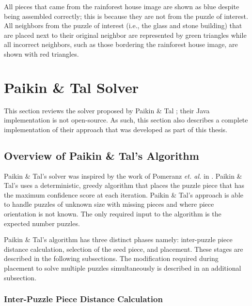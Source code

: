 \documentclass{report}
\begin{document}
All pieces that came from the rainforest house image are shown as blue despite being assembled correctly; this is because they are not from the puzzle of interest.  All neighbors from the puzzle of interest (i.e., the glass and stone building) that are placed next to their original neighbor are represented by green triangles while all incorrect neighbors, such as those bordering the rainforest house image, are shown with red triangles.









\pagebreak
\section{Paikin \& Tal Solver}\label{sec:paikinTalSolver}

This section reviews the solver proposed by Paikin \& Tal \cite{paikin2015}; their Java implementation is not open-source.  As such, this section also describes a complete implementation of their approach that was developed as part of this thesis.

\subsection{Overview of Paikin \& Tal's Algorithm}\label{sec:paikinTalAlgorithm}

Paikin \& Tal's solver was inspired by the work of Pomeranz \textit{et. al.} in \cite{pomeranz2011}.  Paikin \& Tal's uses a deterministic, greedy algorithm that places the puzzle piece that has the maximum confidence score at each iteration. Paikin \& Tal's approach is able to handle puzzles of unknown size with missing pieces and where piece orientation is not known.  The only required input to the algorithm is the expected number puzzles.

Paikin \& Tal's algorithm has three distinct phases namely: inter-puzzle piece distance calculation, selection of the seed piece, and placement.  These stages are described in the following subsections.  The modification required during placement to solve multiple puzzles simultaneously is described in an additional subsection.

\subsubsection{Inter-Puzzle Piece Distance Calculation}\label{sec:paikinTalInterPieceDistance}
\end{document}
